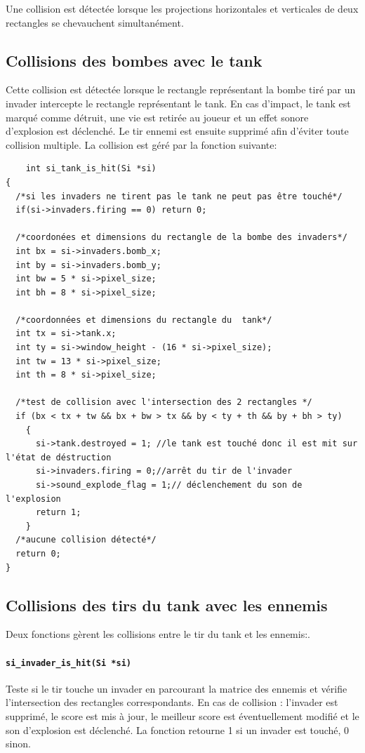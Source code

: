 \documentclass[12pt,a4paper]{report}
\begin{document}
Une collision est détectée lorsque les projections horizontales et verticales de deux rectangles se chevauchent simultanément.  

\subsection{Collisions des bombes avec le tank}
Cette collision est détectée lorsque le rectangle représentant la bombe tiré par un invader intercepte le rectangle représentant le tank.  
En cas d’impact, le tank est marqué comme détruit, une vie est retirée au joueur et un effet sonore d’explosion est déclenché.  
Le tir ennemi est ensuite supprimé afin d’éviter toute collision multiple.
La collision est  géré par la fonction suivante:
\begin{lstlisting}
    int si_tank_is_hit(Si *si)
{
  /*si les invaders ne tirent pas le tank ne peut pas être touché*/
  if(si->invaders.firing == 0) return 0;

  /*coordonées et dimensions du rectangle de la bombe des invaders*/
  int bx = si->invaders.bomb_x;
  int by = si->invaders.bomb_y;
  int bw = 5 * si->pixel_size;
  int bh = 8 * si->pixel_size;

  /*coordonnées et dimensions du rectangle du  tank*/
  int tx = si->tank.x;
  int ty = si->window_height - (16 * si->pixel_size); 
  int tw = 13 * si->pixel_size;
  int th = 8 * si->pixel_size;

  /*test de collision avec l'intersection des 2 rectangles */
  if (bx < tx + tw && bx + bw > tx && by < ty + th && by + bh > ty)
    {
      si->tank.destroyed = 1; //le tank est touché donc il est mit sur l'état de déstruction
      si->invaders.firing = 0;//arrêt du tir de l'invader
      si->sound_explode_flag = 1;// déclenchement du son de l'explosion
      return 1;
    }
  /*aucune collision détecté*/
  return 0;
}
\end{lstlisting}

\subsection{Collisions des tirs du tank avec les ennemis}


Deux fonctions gèrent les collisions entre le tir du tank et les ennemis:.


\paragraph{\texttt{si\_invader\_is\_hit(Si *si)}}  
Teste si le tir touche un invader en parcourant la matrice des ennemis et vérifie  l'intersection des rectangles correspondants.  
En cas de collision : l'invader est supprimé, le score est mis à jour, le meilleur score est éventuellement modifié et le son d'explosion est déclenché. La fonction retourne 1 si un invader est touché, 0 sinon.
\end{document}
